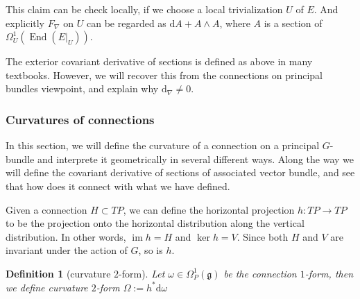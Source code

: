\documentclass[11pt]{amsart}
\numberwithin{equation}{section}
\theoremstyle{plain}
\theoremstyle{plain}
\newtheorem{defnsub}[thmsub]{Definition}
\numberwithin{equation}{section}
\begin{document}
This claim can be check locally, if we choose a local trivialization $U$ of $E$. And explicitly $F_{\nabla}$ on $U$ can be regarded as $\mathrm{d}A+A\wedge A$, where $A$ is a section of $\Omega_U^1(\operatorname{End}(E|_U))$.

The exterior covariant derivative of sections is defined as above in many textbooks. However, we will recover this from the connections on principal bundles viewpoint, and explain why $\mathrm{d}_{\nabla}\neq0$.
\subsubsection{Curvatures of connections}
In this section, we will define the curvature of a connection on a principal $G$-bundle and interprete it geometrically in several different ways. Along the way we will define the covariant derivative of sections of associated vector bundle, and see that how does it connect with what we have defined. 

Given a connection $H\subset TP$, we can define the horizontal projection $h:TP\to TP$ to be the projection onto the horizontal distribution along the vertical distribution. In other words, $\operatorname{im}h=H$ and $\operatorname{ker}h=V$. Since both $H$ and $V$ are invariant under the action of $G$, so is $h$.

\begin{defnsub}[curvature $2$-form]
Let $\omega\in\Omega_P^1(\mathfrak{g})$ be the connection $1$-form, then we define curvature $2$-form $\Omega:=h^*\mathrm{d}\omega$
\end{defnsub}
\end{document}
